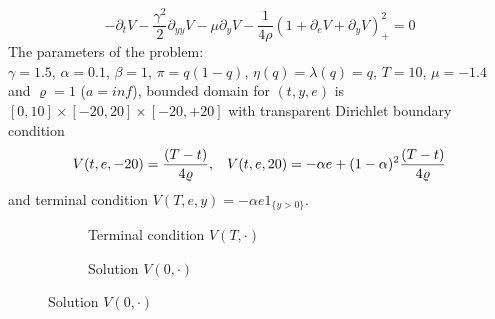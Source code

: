 \documentclass[border=10pt]{article}
\begin{document}
\[  -\partial_t V - \frac{\gamma^2}{2}\partial_{yy} V -\mu \partial_{y} V -\frac{1}{4\rho}(1+\partial_e V + \partial_y V)_+^2 = 0  \]   
The parameters of the problem:\\ 
$\gamma=1.5$, $\alpha=0.1$, $\beta=1$, $\pi=q(1-q)$, $\eta(q)=\lambda(q)=q$, $T=10$, $\mu=-1.4$ and $\varrho=1$ ($a=inf$),  bounded domain for $(t,y,e)$ is $[0,10]\times[-20, 20]\times[-20, +20]$ with transparent Dirichlet boundary condition 
\[V(t,e,-20)=\frac{(T-t)}{4\varrho},\hspace*{.3cm} V(t,e,20)=-\alpha e+(1-\alpha)^2\frac{(T-t)}{4\varrho}
\]
and terminal condition $V(T,e,y)=-\alpha e1_{\{y>0\}}$.
\begin{figure}
\begin{subfigure}[b]{0.5\textwidth}
\centering
{}
\caption{Terminal condition $V(T,\cdot)$}
\end{subfigure}
\begin{subfigure}[b]{0.5\textwidth}
\centering
{}
\caption{Solution $V(0,\cdot)$}
\end{subfigure}
\end{figure}
\end{document}
